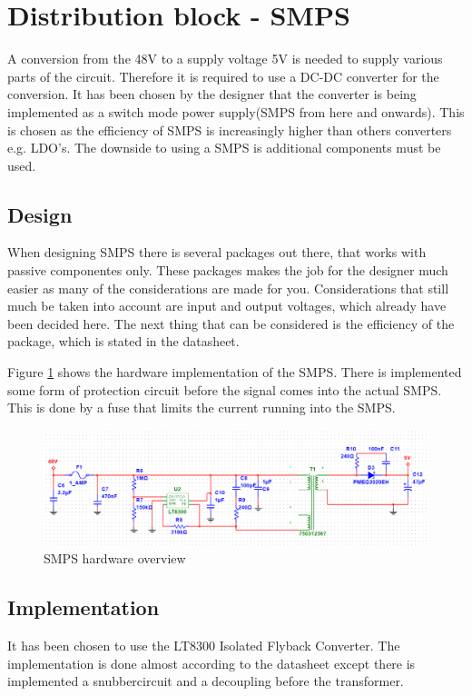 \section{Distribution block - SMPS}
A conversion from the 48V to a supply voltage 5V is needed to supply various parts of the circuit. Therefore it is required to use a DC-DC converter for the conversion. It has been chosen by the designer that the converter is being implemented as a switch mode power supply(SMPS from here and onwards). This is chosen as the efficiency of SMPS is increasingly higher than others converters e.g. LDO's. The downside to using a SMPS is additional components must be used.  

\subsection{Design}

When designing SMPS there is several packages out there, that works with passive componentes only. These packages makes the job for the designer much easier as many of the considerations are made for you. Considerations that still much be taken into account are input and output voltages, which already have been decided here. The next thing that can be considered is the efficiency of the package, which is stated in the datasheet.

Figure \ref{fig:SMPS_control} shows the hardware implementation of the SMPS. There is implemented some form of protection circuit before the signal comes into the actual SMPS. This is done by a fuse that limits the current running into the SMPS. 

\begin{figure}[H]
	\centering
	\includegraphics[width=0.7\linewidth]{Hardware/Pictures/SMPS_hw}
	\caption{SMPS hardware overview}
	\label{fig:SMPS_control}
\end{figure}

\subsection{Implementation}
It has been chosen to use the LT8300 Isolated Flyback Converter. The implementation is done almost according to the datasheet except there is implemented a snubbercircuit and a decoupling before the transformer.  \\

